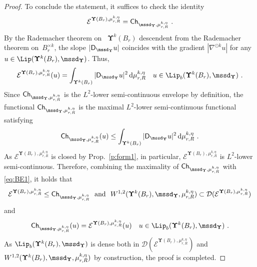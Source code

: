 \documentclass[11pt,letterpaper]{amsart}
\newcommand{\Ch}{\mathsf{Ch}}
\newcommand{\dom}[1]{\mathcal D(#1)}
\newcommand{\diff}{\mathop{}\!\mathrm{d}}
\newcommand{\comma}{\,\,\mathrm{,}\;\,}
\newcommand{\fstop}{\,\,\mathrm{.}}
\newcommand{\QP}{{\mu}}
\newcommand{\dUpsilon}{{\mathbf \Upsilon}}
\newcommand{\U}{\dUpsilon}
\newcommand{\E}{\mathcal E}
\renewcommand{\1}{\mathbf 1}
\numberwithin{equation}{section}
\theoremstyle{plain}
\theoremstyle{definition}
\theoremstyle{remark}
\begin{document}
\begin{proof}
To conclude the statement, it suffices to check the identity 
$$\E^{\U(B_r), \mu_{r, R}^{k, \eta}}=\Ch_{\mssd_\U, \mu_{r, R}^{k, \eta}} \fstop$$ 
By the Rademacher theorem on~ $\U^k(B_r)$ descendent from the Rademacher theorem on~$B_r^{\times k}$,  the slope $|\mathsf D_{\mssd_\U} u|$ coincides with the gradient $|\nabla^{\odot k} u|$ for any $u \in \Lip(\U^k(B_r), \mssd_\U)$.  
Thus, 
\begin{align} \label{eq:BE1}
\E^{\U(B_r), \mu_{r, R}^{k, \eta}}(u) = \int_{\U^k(B_r)} |\mathsf D_{\mssd_\U} u|^2 \diff \QP_{r, R}^{k ,\eta} \quad  u \in \Lip_b(\U^k(B_r), \mssd_\U) \fstop
\end{align}
Since $\Ch_{\mssd_\U, \mu_{r, R}^{k, \eta}}$ is  the $L^2$-lower semi-continuous envelope by definition, the functional $\Ch_{\mssd_\U, \mu_{r, R}^{k, \eta}}$ is the maximal $L^2$-lower semi-continuous functional satisfying 
$$\Ch_{\mssd_\U, \mu_{r, R}^{k, \eta}}(u) \le \int_{\U^k(B_r)} |\mathsf D_{\mssd_\U} u|^2 \diff \QP_{r, R}^{k ,\eta} \fstop$$
As $\E^{\U(B_r), \mu_{r, R}^{k, \eta}}$ is closed by Prop.~\ref{p:form1}, in particular, $\E^{\U(B_r), \mu_{r, R}^{k, \eta}}$ is $L^2$-lower semi-continuous. Therefore, combining the maximality of $\Ch_{\mssd_\U, \mu_{r, R}^{k, \eta}}$ with \eqref{eq:BE1}, it holds that 
$$\text{$\E^{\U(B_r), \mu_{r, R}^{k, \eta}}\le \Ch_{\mssd_\U, \mu_{r, R}^{k, \eta}}$  \ and \ $W^{1,2}(\U^k(B_r), \mssd_\U, \mu_{r, R}^{k, \eta}) \subset \dom{\E^{\U(B_r), \mu_{r, R}^{k, \eta}}}$}$$ 
and 
$$\Ch_{\mssd_\U, \mu_{r, R}^{k, \eta}}(u) = \E^{\U(B_r), \mu_{r, R}^{k, \eta}}(u) \quad u \in \Lip_b(\U^k(B_r), \mssd_\U) \fstop$$
As $\Lip_b(\U^k(B_r), \mssd_\U)$ is dense both in $\dom{\E^{\U(B_r), \mu_{r, R}^{k, \eta}}}$ and $W^{1,2}(\U^k(B_r), \mssd_\U, \mu_{r, R}^{k, \eta})$ by construction, the proof is completed.

\end{proof}
\end{document}
